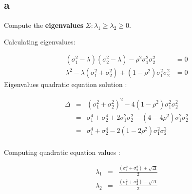 \subsection{a} 
\label{section_1_a}
\par
Compute the \textbf{eigenvalues} $\Sigma: \lambda_1 \geq \lambda_2 \geq 0$.

\begin{solution}\hfill\break
Calculating eigenvalues:

\begin{equation}
\label{eq:1.1.a:eigenvalues}
\begin{aligned}
(\sigma_{1}^{2}  - \lambda)(  \sigma_{2}^{2}  - \lambda) -   \rho^2\sigma_{1}^{2} \sigma_{2}^{2} & = 0 \\
\lambda^2 -\lambda(\sigma_{1}^{2}  + \sigma_{2}^{2} ) + (1- \rho^2)\sigma_{1}^{2} \sigma_{2}^{2} & = 0
 \end{aligned}
\end{equation}
\hfill\break
Eigenvalues quadratic equation solution :

\begin{equation}
\begin{aligned}
\Delta & = & (\sigma_{1}^{2}  + \sigma_{2}^{2} )^2 - 4 (1- \rho^2)\sigma_{1}^{2} \sigma_{2}^{2}  \\
          & = & \sigma_{1}^{4}  + \sigma_{2}^{4}  + 2\sigma_{1}^{2} \sigma_{2}^{2}  - (4 - 4 \rho^2)\sigma_{1}^{2}\sigma_{2}^{2} \\
          & = & \sigma_{1}^{4}  + \sigma_{2}^{4}   - 2(1 - 2 \rho^2)\sigma_{1}^{2}\sigma_{2}^{2} \\
 \end{aligned}
\end{equation}

\hfill\break
Computing quadratic equation values :

\begin{equation}
\begin{aligned}
\lambda_1 & = & \frac{(\sigma_{1}^{2}  + \sigma_{2}^{2}) + \sqrt{\Delta} }{2} \\
\lambda_2 & = & \frac{(\sigma_{1}^{2}  + \sigma_{2}^{2}) -\sqrt{\Delta} }{2} 
 \end{aligned}
\end{equation}


\end{solution}